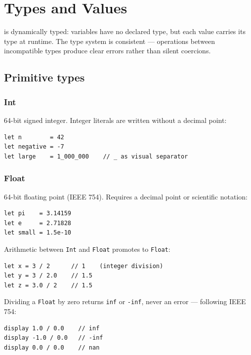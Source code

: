 \chapter{Types and Values}

\hayashi{} is dynamically typed: variables have no declared type, but each
value carries its type at runtime. The type system is consistent —
operations between incompatible types produce clear errors rather than
silent coercions.

\section{Primitive types}

\subsection{Int}

64-bit signed integer. Integer literals are written without a decimal point:

\begin{lstlisting}
let n        = 42
let negative = -7
let large    = 1_000_000    // _ as visual separator
\end{lstlisting}

\subsection{Float}

64-bit floating point (IEEE 754). Requires a decimal point or scientific
notation:

\begin{lstlisting}
let pi    = 3.14159
let e     = 2.71828
let small = 1.5e-10
\end{lstlisting}

Arithmetic between \texttt{Int} and \texttt{Float} promotes to
\texttt{Float}:

\begin{lstlisting}
let x = 3 / 2      // 1    (integer division)
let y = 3 / 2.0    // 1.5
let z = 3.0 / 2    // 1.5
\end{lstlisting}

Dividing a \texttt{Float} by zero returns \texttt{inf} or \texttt{-inf},
never an error — following IEEE 754:

\begin{lstlisting}
display 1.0 / 0.0    // inf
display -1.0 / 0.0   // -inf
display 0.0 / 0.0    // nan
\end{lstlisting}

